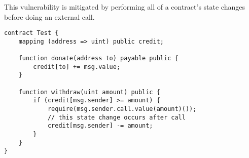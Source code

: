 This vulnerability is mitigated by performing all of a contract's state changes before doing an external call.
\begin{lstlisting}[basicstyle=\small]
contract Test {
    mapping (address => uint) public credit;

    function donate(address to) payable public {
        credit[to] += msg.value;
    }

    function withdraw(uint amount) public {
        if (credit[msg.sender] >= amount) {
            require(msg.sender.call.value(amount)());
            // this state change occurs after call
            credit[msg.sender] -= amount;
        }
    }
}
\end{lstlisting}
